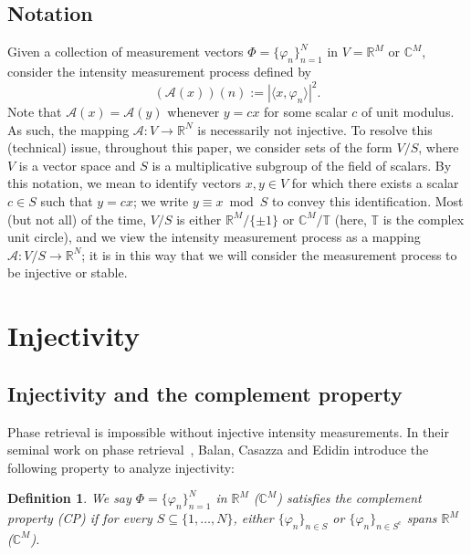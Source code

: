\documentclass[times,10pt]{elsarticle}
\theoremstyle{plain}
\newtheorem{definition}[theorem]{Definition}
\begin{document}
\subsection{Notation}

Given a collection of measurement vectors $\Phi=\{\varphi_n\}_{n=1}^N$ in $V=\mathbb{R}^M$ or $\mathbb{C}^M$, consider the intensity measurement process defined by 
\begin{equation*}
(\mathcal{A}(x))(n):=|\langle x,\varphi_n\rangle|^2.
\end{equation*}
Note that $\mathcal{A}(x)=\mathcal{A}(y)$ whenever $y=cx$ for some scalar $c$ of unit modulus.
As such, the mapping $\mathcal{A}\colon V\rightarrow\mathbb{R}^N$ is necessarily not injective.
To resolve this (technical) issue, throughout this paper, we consider sets of the form $V/S$, where $V$ is a vector space and $S$ is a multiplicative subgroup of the field of scalars.
By this notation, we mean to identify vectors $x,y\in V$ for which there exists a scalar $c\in S$ such that $y=cx$; we write $y\equiv x\bmod S$ to convey this identification.
Most (but not all) of the time, $V/S$ is either $\mathbb{R}^M/\{\pm1\}$ or $\mathbb{C}^M/\mathbb{T}$ (here, $\mathbb{T}$ is the complex unit circle), and we view the intensity measurement process as a mapping $\mathcal{A}\colon V/S\rightarrow\mathbb{R}^N$; it is in this way that we will consider the measurement process to be injective or stable.


\section{Injectivity}

\subsection{Injectivity and the complement property}

Phase retrieval is impossible without injective intensity measurements.
In their seminal work on phase retrieval~\cite{BalanCE:06}, Balan, Casazza and Edidin introduce the following property to analyze injectivity:

\begin{definition}
We say $\Phi=\{\varphi_n\}_{n=1}^N$ in $\mathbb{R}^M$ ($\mathbb{C}^M$) satisfies the \textit{complement property (CP)} if for every $S\subseteq\{1,\ldots,N\}$, either $\{\varphi_n\}_{n\in S}$ or $\{\varphi_n\}_{n\in S^\mathrm{c}}$ spans $\mathbb{R}^M$ ($\mathbb{C}^M$).
\end{definition}
\end{document}
